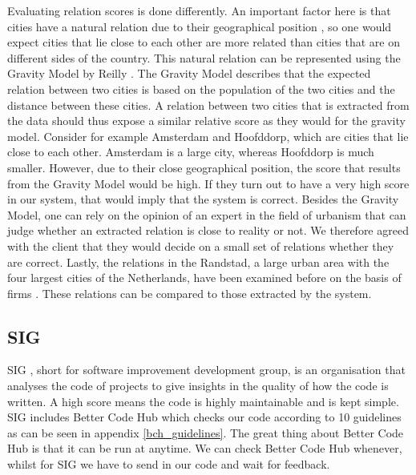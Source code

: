 Evaluating relation scores is done differently. An important factor here is that cities have a natural relation due to their geographical position \cite{tobler1970computer}, so one would expect cities that lie close to each other are more related than cities that are on different sides of the country. This natural relation can be represented using the Gravity Model by Reilly \cite{reilly1931law}. The Gravity Model describes that the expected relation between two cities is based on the population of the two cities and the distance between these cities. A relation between two cities that is extracted from the data should thus expose a similar relative score as they would for the gravity model. Consider for example Amsterdam and Hoofddorp, which are cities that lie close to each other. Amsterdam is a large city, whereas Hoofddorp is much smaller. However, due to their close geographical position, the score that results from the Gravity Model would be high. If they turn out to have a very high score in our system, that would imply that the system is correct. Besides the Gravity Model, one can rely on the opinion of an expert in the field of urbanism that can judge whether an extracted relation is close to reality or not. We therefore agreed with the client that they would decide on a small set of relations whether they are correct. Lastly, the relations in the Randstad, a large urban area with the four largest cities of the Netherlands, have been examined before on the basis of firms \cite{van2010economic}. These relations can be compared to those extracted by the system.

\subsection{SIG}
SIG \cite{sig}, short for software improvement development group, is an organisation that analyses the code of projects to give insights in the quality of how the code is written. A high score means the code is highly maintainable and is kept simple. SIG includes Better Code Hub \cite{better_code_hub} which checks our code according to 10 guidelines as can be seen in appendix \ref{bch_guidelines}. The great thing about Better Code Hub is that it can be run at anytime. We can check Better Code Hub whenever, whilst for SIG we have to send in our code and wait for feedback.